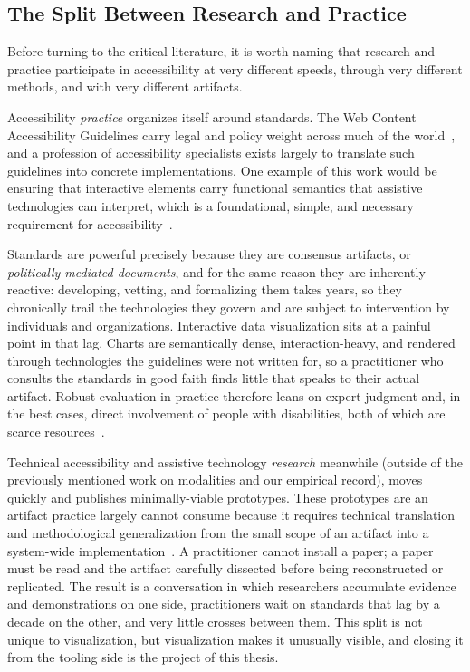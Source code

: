 \documentclass[12pt]{cmuthesis}
\begin{document}
\subsection{The Split Between Research and Practice}
 
Before turning to the critical literature, it is worth naming that research and practice participate in accessibility at very different speeds, through very different methods, and with very different artifacts.
 
Accessibility \textit{practice} organizes itself around standards. The Web Content Accessibility Guidelines carry legal and policy weight across much of the world~\cite{WCAG}, and a profession of accessibility specialists exists largely to translate such guidelines into concrete implementations. One example of this work would be ensuring that interactive elements carry functional semantics that assistive technologies can interpret, which is a foundational, simple, and necessary requirement for accessibility~\cite{WAI2021Semantics}.

Standards are powerful precisely because they are consensus artifacts, or \textit{politically mediated documents}, and for the same reason they are inherently reactive: developing, vetting, and formalizing them takes years, so they chronically trail the technologies they govern and are subject to intervention by individuals and organizations. Interactive data visualization sits at a painful point in that lag. Charts are semantically dense, interaction-heavy, and rendered through technologies the guidelines were not written for, so a practitioner who consults the standards in good faith finds little that speaks to their actual artifact. Robust evaluation in practice therefore leans on expert judgment and, in the best cases, direct involvement of people with disabilities, both of which are scarce resources~\cite{Power2012Guidelines}.
 
Technical accessibility and assistive technology \textit{research} meanwhile (outside of the previously mentioned work on modalities and our empirical record), moves quickly and publishes minimally-viable prototypes. These prototypes are an artifact practice largely cannot consume because it requires technical translation and methodological generalization from the small scope of an artifact into a system-wide implementation~\cite{Fleizach}. A practitioner cannot install a paper; a paper must be read and the artifact carefully dissected before being reconstructed or replicated. The result is a conversation in which researchers accumulate evidence and demonstrations on one side, practitioners wait on standards that lag by a decade on the other, and very little crosses between them. This split is not unique to visualization, but visualization makes it unusually visible, and closing it from the tooling side is the project of this thesis.
\end{document}
